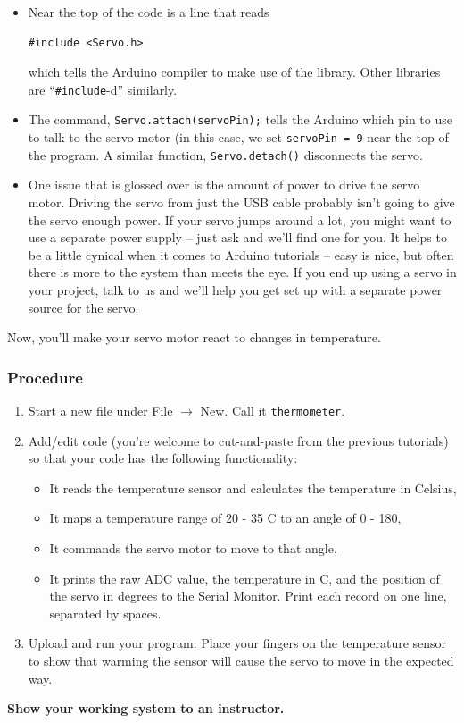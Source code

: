 \documentclass[11pt]{article} %
\begin{document}
\begin{itemize}
\item Near the top of the code is a line that reads
\begin{verbatim}
#include <Servo.h>
\end{verbatim}
which tells the Arduino compiler to make use of the library. Other libraries are “\verb|#include|-d” similarly.
\item The command, \verb|Servo.attach(servoPin);| tells the Arduino which pin to use to talk to the servo motor (in this case, we set \verb|servoPin = 9| near the top of the program. A similar function, \verb|Servo.detach()| disconnects the servo.
\item One issue that is glossed over is the amount of power to drive the servo motor. Driving the servo from just the USB cable probably isn't going to give the servo enough power. If your servo jumps around a lot, you might want to use a separate power supply -- just ask and we'll find one for you. It helps to be a little cynical when it comes to Arduino tutorials -- easy is nice, but often there is more to the system than meets the eye. If you end up using a servo in your project, talk to us and we'll help you get set up with a separate power source for the servo.
\end{itemize}

Now, you’ll make your servo motor react to changes in temperature.
 
\subsubsection*{Procedure}

\begin{enumerate}
\item Start a new file under File $\rightarrow$ New. Call it \verb|thermometer|.
\item Add/edit code (you're welcome to cut-and-paste from the previous tutorials) so that your code has the following functionality:
\begin{itemize}
    \item It reads the temperature sensor and calculates the temperature in Celsius,
    \item It maps a temperature range of 20 - 35 C to an angle of 0 - 180,
    \item It commands the servo motor to move to that angle,
    \item It prints the raw ADC value, the temperature in C, and the position of the servo in degrees to the Serial Monitor. Print each record on one line, separated by spaces.
\end{itemize}
\item Upload and run your program. Place your fingers on the temperature sensor to show that warming the sensor will cause the servo to move in the expected way.
\end{enumerate}

{\bf Show your working system to an instructor.}
\end{document}

